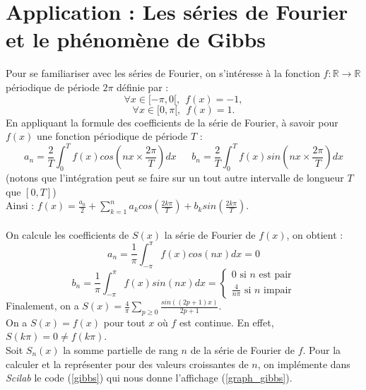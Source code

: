 \documentclass[a4paper,10pt]{report}
\begin{document}
\section{Application : Les séries de Fourier et le phénomène de Gibbs}
Pour se familiariser avec les séries de Fourier, on s'intéresse à la fonction $f : \mathbb{R} \longrightarrow \mathbb{R}$ périodique de période $2\pi$ définie par :
\abovedisplayskip=0mm
\begin{displaymath}
\forall x \in [-\pi,0[, \ \ f(x)=-1,
\end{displaymath}
\abovedisplayskip=0mm
\begin{displaymath}
\forall x \in [0,\pi[, \ \ f(x)=1.
\end{displaymath}
En appliquant la formule des coefficients de la série de Fourier, à savoir pour $f(x)$ une fonction périodique de période $T$ :
\abovedisplayskip=0mm
\begin{displaymath}
a_n = \frac{2}{T} \int_0^{T} f(x)cos\left(nx \times \frac{2\pi}{T}\right)dx \ \ \ \ \ \ \ b_n = \frac{2}{T} \int_0^{T} f(x)sin\left(nx \times \frac{2\pi}{T}\right)dx 
\end{displaymath}
(notons que l'intégration peut se faire sur un tout autre intervalle de longueur $T$ que $[0,T]$)\\
Ainsi : $f(x) = \frac{a_0}{2} + \sum \limits_{k=1}^n a_k cos\left(\frac{2k\pi}{T}\right) + b_k sin\left(\frac{2k\pi}{T}\right)$.\\ \\
On calcule les coefficients de $S(x)$ la série de Fourier de $f(x)$, on obtient :
\abovedisplayskip=0mm
\begin{displaymath}
a_n = \frac{1}{\pi} \int_{-\pi}^{\pi} f(x)cos(nx)dx = 0
\end{displaymath}
\abovedisplayskip=0mm
\begin{displaymath}
b_n = \frac{1}{\pi} \int_{-\pi}^{\pi} f(x)sin(nx)dx =
\left\lbrace
\begin{array}{l}
0 \text{ si $n$ est pair}  \\
\frac{4}{n\pi} \text{ si $n$ impair}
\end{array}\right.
\end{displaymath}
Finalement, on a $S(x)= \frac{4}{\pi} \sum \limits_{p\geq 0} \frac{sin((2p+1)x)}{2p+1}$. \\
On a $S(x)=f(x)$ pour tout $x$ où $f$ est continue. En effet, $S(k\pi)=0 \neq f(k\pi)$. \\
\indent Soit $S_n(x)$ la somme partielle de rang $n$ de la série de Fourier de $f$. Pour la calculer et la représenter pour des valeurs croissantes de $n$, on implémente dans \textit{Scilab} le code (\ref{gibbs}) qui nous donne l'affichage (\ref{graph_gibbs}).
\end{document}
